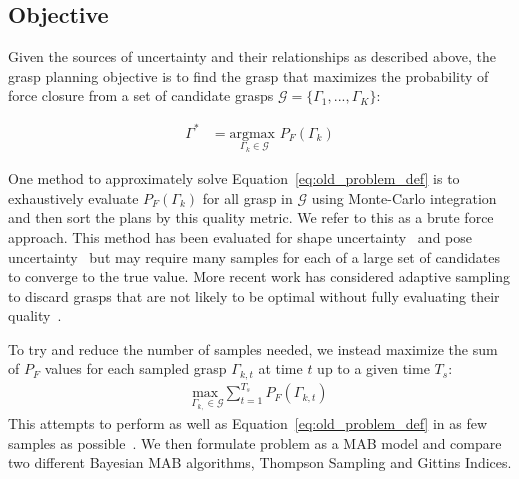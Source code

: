 \documentclass[10pt, conference]{ieeeconf}      %
\newcommand{\mG}{\mathcal{G}}
\begin{document}
\subsection{Objective}

Given the sources of uncertainty and their relationships as described above, the grasp planning objective is to find the grasp that maximizes the probability of force closure from a set of candidate grasps $\mG = \{\Gamma_1, ..., \Gamma_K\}$:

\vspace{-2ex}
\begin{align}
\Gamma^* &= \underset{\Gamma_k \in \mG}{\text{argmax }} P_F\left( \Gamma_k\right) \label{eq:old_problem_def}
\end{align}



One method to approximately solve Equation~\ref{eq:old_problem_def} is to exhaustively evaluate $P_F(\Gamma_k)$ for all grasp in $\mG$ using Monte-Carlo integration and then sort the plans by this quality metric.
We refer to this as a brute force approach. 
This method has been evaluated for shape uncertainty~\cite{christopoulos2007handling, kehoe2012estimating} and pose uncertainty~\cite{weisz2012pose} but may require many samples for each of a large set of candidates to converge to the true value.
More recent work has considered adaptive sampling to discard grasps that are not likely to be optimal without fully evaluating their quality~\cite{kehoe2012toward}.

To try and reduce the number of samples needed, we instead maximize the sum of $P_F$ values for each sampled grasp  $\Gamma_{k,t}$ at time $t$ up to a given time $T_s$:
\begin{align}
    \underset{\Gamma_{k,} \in \mG}{\text{max }} \sum \limits_{t=1}^
    {T_s} P_F \left( \Gamma_{k,t}\right)  \label{eq:problem_def}
\end{align}
\noindent This attempts to perform as well as Equation~\ref{eq:old_problem_def} in as few samples as possible~\cite{srinivas2009gaussian}. We then formulate  problem as a MAB model and compare two different Bayesian MAB algorithms, Thompson Sampling and Gittins Indices.
\end{document}
